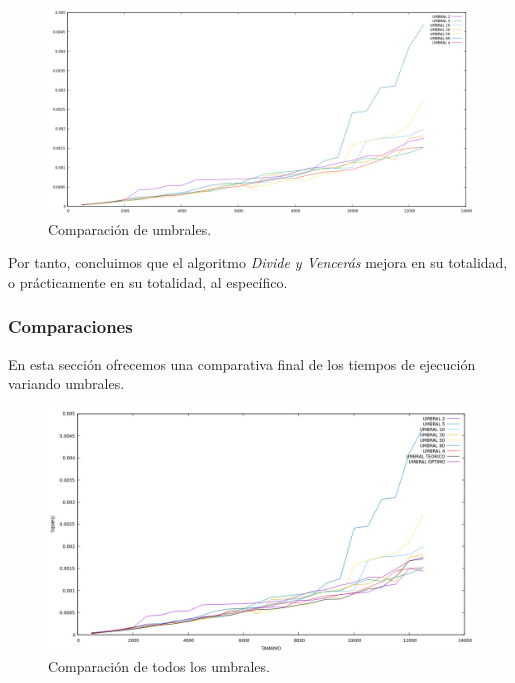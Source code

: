 \documentclass[a4paper,12pt,twoside]{article} %
\begin{document}
\begin{figure}[h]
  \begin{center}
  
  	\includegraphics[scale=0.3]{comparacion_umbrales.jpeg}
  	\caption{Comparación de umbrales.}
  	
  \end{center}
\end{figure}


Por tanto, concluimos que el algoritmo \textit{Divide y Vencerás} mejora en su totalidad, o prácticamente en su totalidad, al específico.

\newpage

\subsubsection{Comparaciones}

En esta sección ofrecemos una comparativa final de los tiempos de ejecución variando umbrales.\\

\begin{figure}[h]
  \begin{center}
  
  	\includegraphics[scale=0.35]{comparacion.jpeg}
  	\caption{Comparación de todos los umbrales.}
  	
  \end{center}
\end{figure}
\end{document}
